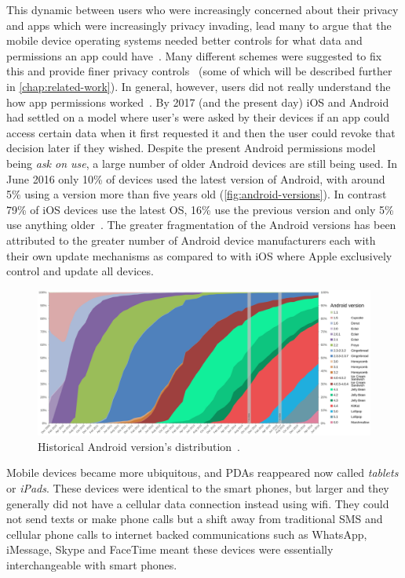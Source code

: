 \documentclass[thesis.tex]{subfiles}
\begin{document}
This dynamic between users who were increasingly concerned about their
privacy and apps which were increasingly privacy invading, lead many
to argue that the mobile device operating systems needed better
controls for what data and permissions an app could
have~\cite{leontiadis_dont_2012}.  Many different schemes were
suggested to fix this and provide finer privacy
controls~\cite{jeon_dr._2012,beresford_mockdroid:_2011,conti_crepe:_2010,backes_appguard_2013}
(some of which will be described further in
\autoref{chap:related-work}).  In general, however, users did not
really understand the how app permissions
worked~\cite{felt_android_2012}.  By 2017 (and the present day) iOS
and Android had settled on a model where user's were asked by their
devices if an app could access certain data when it first requested it
and then the user could revoke that decision later if they wished.
Despite the present Android permissions model being \emph{ask on use},
a large number of older Android devices are still being used.  In June
2016 only 10\% of devices used the latest version of Android, with
around 5\% using a version more than five years old
(\autoref{fig:android-versions}).  In contrast 79\% of iOS devices use
the latest OS, 16\% use the previous version and only 5\% use anything
older~\cite{apple_app_2017}.  The greater fragmentation of the Android
versions has been attributed to the greater number of Android device
manufacturers each with their own update mechanisms as compared to
with iOS where Apple exclusively control and update all devices.

\begin{figure}
\centering
\includegraphics[width=\linewidth]{figures/android-versions.pdf}
\caption[Historical Android version's distribution.]{Historical Android
  version's distribution~\cite{erikrespo_android_2017}.}
\label{fig:android-versions}
\end{figure}

Mobile devices became more ubiquitous, and \acp{PDA} reappeared now
called \emph{tablets} or \emph{iPads}.  These devices were identical
to the smart phones, but larger and they generally did not have a
cellular data connection instead using wifi. They could not send
texts or make phone calls but a shift away from traditional SMS and
cellular phone calls to internet backed communications such as
WhatsApp, iMessage, Skype and FaceTime meant these devices were
essentially interchangeable with smart phones.
\end{document}
